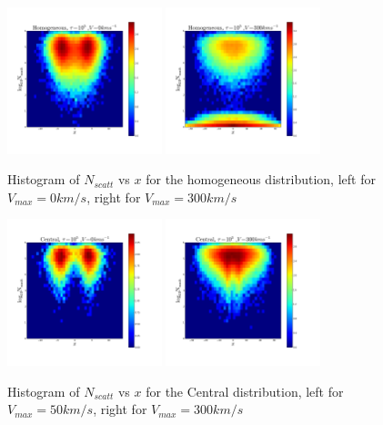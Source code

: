 \documentclass[usenatbib]{mn2e}
\begin{document}
\begin{figure}
     \includegraphics[width=0.40\textwidth]{2dHistogram0t5HOM.png}
     \includegraphics[width=0.40\textwidth]{2dHistogram300t5HOM.png}    
    \caption{Histogram of $N_{scatt}$ vs $x$ for the homogeneous
      distribution, left for $V_{max}=0km/s $, right for
      $V_{max}=300km/s$ \label{fig:NscattHistoHOM}}  
\end{figure}

\begin{figure}
     \includegraphics[width=0.40\textwidth]{2dHistogram0t5.png}
     \includegraphics[width=0.40\textwidth]{2dHistogram300t5.png}    
    \caption{Histogram of $N_{scatt}$ vs $x$ for the Central
      distribution, left for $V_{max}=50km/s $, right for
      $V_{max}=300km/s$ \label{fig:NscattHistoHOM}}  
\end{figure}
\end{document}
